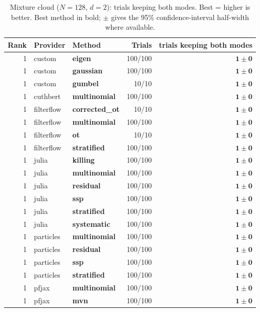 \begin{table}[!htbp]
\centering
\small
\caption{Mixture cloud ($N=128$, $d=2$): trials keeping both modes. Best = higher is better. Best method in bold; $\pm$ gives the 95\% confidence-interval half-width where available.}
\label{tab:mixture-cloud-mode-coverage}
\begin{tabular}{rllrr}
\toprule
Rank & Provider & Method & Trials & trials keeping both modes \\
\midrule
1 & custom & \textbf{eigen} & 100/100 & $\mathbf{1 \pm 0}$ \\
1 & custom & \textbf{gaussian} & 100/100 & $\mathbf{1 \pm 0}$ \\
1 & custom & \textbf{gumbel} & 10/10 & $\mathbf{1 \pm 0}$ \\
1 & cuthbert & \textbf{multinomial} & 100/100 & $\mathbf{1 \pm 0}$ \\
1 & filterflow & \textbf{corrected\_ot} & 10/10 & $\mathbf{1 \pm 0}$ \\
1 & filterflow & \textbf{multinomial} & 100/100 & $\mathbf{1 \pm 0}$ \\
1 & filterflow & \textbf{ot} & 10/10 & $\mathbf{1 \pm 0}$ \\
1 & filterflow & \textbf{stratified} & 100/100 & $\mathbf{1 \pm 0}$ \\
1 & julia & \textbf{killing} & 100/100 & $\mathbf{1 \pm 0}$ \\
1 & julia & \textbf{multinomial} & 100/100 & $\mathbf{1 \pm 0}$ \\
1 & julia & \textbf{residual} & 100/100 & $\mathbf{1 \pm 0}$ \\
1 & julia & \textbf{ssp} & 100/100 & $\mathbf{1 \pm 0}$ \\
1 & julia & \textbf{stratified} & 100/100 & $\mathbf{1 \pm 0}$ \\
1 & julia & \textbf{systematic} & 100/100 & $\mathbf{1 \pm 0}$ \\
1 & particles & \textbf{multinomial} & 100/100 & $\mathbf{1 \pm 0}$ \\
1 & particles & \textbf{residual} & 100/100 & $\mathbf{1 \pm 0}$ \\
1 & particles & \textbf{ssp} & 100/100 & $\mathbf{1 \pm 0}$ \\
1 & particles & \textbf{stratified} & 100/100 & $\mathbf{1 \pm 0}$ \\
1 & pfjax & \textbf{multinomial} & 100/100 & $\mathbf{1 \pm 0}$ \\
1 & pfjax & \textbf{mvn} & 100/100 & $\mathbf{1 \pm 0}$ \\

\end{tabular}
\end{table}

